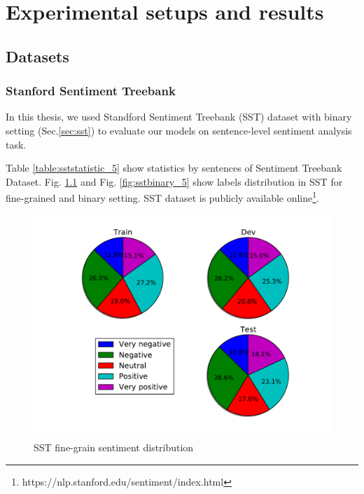 \hypertarget{chap:result}{\chapter{Experimental setups and results}}\label{result-discuss}
\section{Datasets}
\subsection{Stanford Sentiment Treebank}
In this thesis, we used Standford Sentiment Treebank (SST) dataset with binary setting (Sec.\ref{sec:sst}) to evaluate our models on sentence-level sentiment analysis task.

Table \ref{table:sststatistic_5} show statistics by sentences of Sentiment Treebank Dataset. Fig. \ref{fig:sstfinegrain_5} and Fig. \ref{fig:sstbinary_5} show labels distribution in SST for fine-grained and binary setting.
SST dataset is publicly available online\footnote{https://nlp.stanford.edu/sentiment/index.html}.

\begin{figure}[H]
    \begin{minipage}{\textwidth}
        \centering
        \includegraphics[scale=0.6]{figure/sstfinegrain}
        \caption[SST fine-grain sentiment distribution]{SST fine-grain sentiment distribution}
        \label{fig:sstfinegrain_5}
    \end{minipage}
\end{figure}

